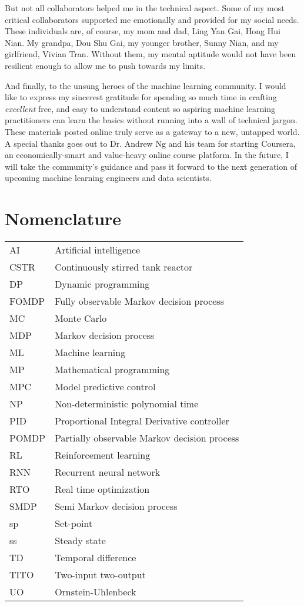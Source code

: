 \documentclass[12pt]{report}
\begin{document}
But not all collaborators helped me in the technical aspect.  Some of my most critical collaborators supported me emotionally and provided for my social needs.  These individuals are, of course, my mom and dad, Ling Yan Gai, Hong Hui Nian.  My grandpa, Dou Shu Gai, my younger brother, Sunny Nian, and my girlfriend, Vivian Tran.  Without them, my mental aptitude would not have been resilient enough to allow me to push towards my limits.

And finally, to the unsung heroes of the machine learning community.  I would like to express my sincerest gratitude for spending so much time in crafting \textit{excellent} free, and easy to understand content so aspiring machine learning practitioners can learn the basics without running into a wall of technical jargon.  These materials posted online truly serve as a gateway to a new, untapped world. A special thanks goes out to Dr. Andrew Ng and his team for starting Coursera, an economically-smart and value-heavy online course platform. In the future, I will take the community's guidance and pass it forward to the next generation of upcoming machine learning engineers and data scientists.

\chapter*{Nomenclature}
\noindent 
\begin{tabular}{@{}ll}
AI & Artificial intelligence \\
CSTR & Continuously stirred tank reactor \\
DP & Dynamic programming \\
FOMDP & Fully observable Markov decision process \\
MC & Monte Carlo \\
MDP & Markov decision process \\
ML & Machine learning \\
MP & Mathematical programming \\
MPC & Model predictive control \\
NP & Non-deterministic polynomial time \\
PID & Proportional Integral Derivative controller \\
POMDP & Partially observable Markov decision process \\
RL & Reinforcement learning \\
RNN & Recurrent neural network \\
RTO & Real time optimization \\
SMDP & Semi Markov decision process \\
sp & Set-point \\
ss & Steady state \\
TD & Temporal difference \\
TITO & Two-input two-output \\
UO & Ornstein-Uhlenbeck \\
\end{tabular}
\end{document}
